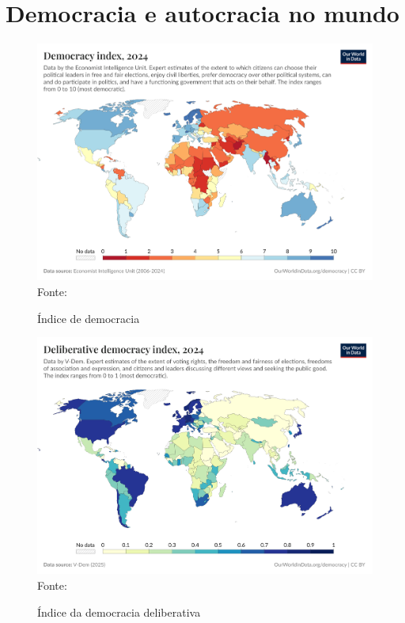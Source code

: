 \chapter{Democracia e autocracia no mundo}
\label{demo_auto_mundo}

\begin{figure}[ht]
    \centering
    \caption{Índice de democracia}
    \includegraphics[width=1\linewidth]{figuras/democracia/democracy-index-eiu.png}
    \label{fig:democracy-index-eiu}
    \footnotesize{Fonte: \cite{electoral_democracy_eiu}}
\end{figure}


\begin{figure}[ht]
    \centering
    \caption{Índice da democracia deliberativa}
    \includegraphics[width=1\linewidth]{figuras/democracia/deliberative-democracy-index-vdem.png}
    \label{fig:deliberative-democracy-index-vdem}
    \footnotesize{Fonte: \cite{deliberative_democracy_index_vdem}}
\end{figure}

